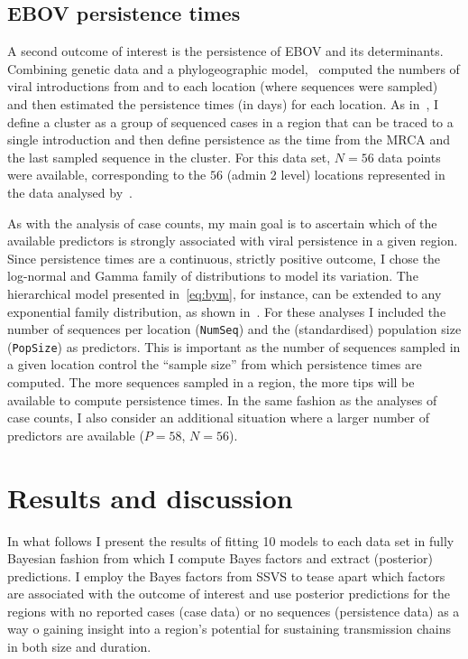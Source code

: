 \subsection*{EBOV persistence times}

A second outcome of interest is the persistence of EBOV and its determinants.
Combining genetic data and a phylogeographic model,~\cite{Dudas2017} computed the numbers of viral introductions from and to each location (where sequences were sampled) and then estimated the persistence times (in days) for each location.
As in~\cite{Dudas2017}, I define a cluster as a group of sequenced cases in a region that can be traced to a single introduction and then define persistence as the time from the MRCA and the last sampled sequence in the cluster.
For this data set, $N = 56$ data points were available, corresponding to the $56$ (admin 2 level) locations represented in the data analysed by~\cite{Dudas2017}. 

As with the analysis of case counts, my main goal is to ascertain which of the available predictors is strongly associated with viral persistence in a given region.
Since persistence times are a continuous, strictly positive outcome, I chose the log-normal and Gamma family of distributions to model its variation.
The hierarchical model presented in~\ref{eq:bym}, for instance, can be extended to any exponential family distribution, as shown in~\cite[Sec. 5.5]{Banerjee2003}.
For these analyses I included the number of sequences per location (\verb|NumSeq|) and the (standardised) population size (\verb|PopSize|) as predictors.
This is important as the number of sequences sampled in a given location control the ``sample size'' from which persistence times are computed.
The more sequences sampled in a region, the more tips will be available to compute persistence times.
In the same fashion as the analyses of case counts, I also consider an additional situation where a larger number of predictors are available ($P = 58$, $N = 56$).
 
\section{Results and discussion}

In what follows I present the results of fitting 10 models to each data set in fully Bayesian fashion from which I compute Bayes factors and extract (posterior) predictions.
I employ the Bayes factors from SSVS to tease apart which factors are associated with the outcome of interest and use posterior predictions for the regions with no reported cases (case data) or no sequences (persistence data) as a way o gaining insight into a region's potential for sustaining transmission chains in both size and duration.


